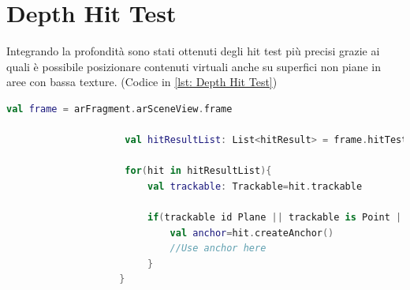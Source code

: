 \documentclass[crop=false, class=book]{standalone}
\begin{document}
		\section{Depth Hit Test}
		
		Integrando la profondità sono stati ottenuti degli hit test più precisi grazie ai quali è possibile  							posizionare contenuti virtuali anche su superfici non piane in aree con bassa texture. (Codice in \vref{lst: Depth Hit 			Test})\\

		\begin{center}
				\begin{minipage}{0.95\textwidth}
					\begin{lstlisting}[caption={Depth Hit Test}, label={lst: Depth Hit Test}, language=Kotlin]
					 val frame = arFragment.arSceneView.frame
					
					 val hitResultList: List<hitResult> = frame.hitTest(tap)
					
					 for(hit in hitResultList){
						 val trackable: Trackable=hit.trackable
						
						 if(trackable id Plane || trackable is Point || trackable is DepthPoint){
							 val anchor=hit.createAnchor()
							 //Use anchor here
						 }
					}
					
				\end{lstlisting}
			\end{minipage}
		\end{center}
		
\end{document}
